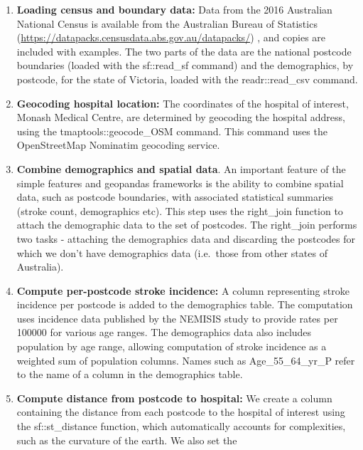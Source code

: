 \documentclass[utf8]{frontiersHLTH}
\begin{document}
\begin{table}[h]
\begin{center}
\begin{mdframed}[backgroundcolor=blue!20]
  \sffamily
  \tiny
\begin{enumerate}
\def\labelenumi{\arabic{enumi}.}
\item
  {\bf Loading census and boundary data:} Data from the 2016 Australian
  National Census is available from the Australian Bureau of Statistics
  (\url{https://datapacks.censusdata.abs.gov.au/datapacks/}) , and
  copies are included with examples. The two parts of the data are the
  national postcode boundaries (loaded with the sf::read\_sf command)
  and the demographics, by postcode, for the state of Victoria, loaded
  with the readr::read\_csv command.
\item
  {\bf Geocoding hospital location:} The coordinates of the hospital of
  interest, Monash Medical Centre, are determined by geocoding the
  hospital address, using the tmaptools::geocode\_OSM command. This
  command uses the OpenStreetMap Nominatim geocoding service.
\item
  {\bf Combine demographics and spatial data}. An important feature of the
  simple features and geopandas frameworks is the ability to combine
  spatial data, such as postcode boundaries, with associated statistical
  summaries (stroke count, demographics etc). This step uses the
  right\_join function to attach the demographic data to the set of
  postcodes. The right\_join performs two tasks - attaching the
  demographics data and discarding the postcodes for which we don't have
  demographics data (i.e.~those from other states of Australia).
\item
  {\bf Compute per-postcode stroke incidence:} A column representing stroke
  incidence per postcode is added to the demographics table. The
  computation uses incidence data published by the NEMISIS\cite{thrift_stroke_2000}
  study to provide rates per 100000 for various age ranges. The
  demographics data also includes population by age range, allowing
  computation of stroke incidence as a weighted sum of population
  columns. Names such as Age\_55\_64\_yr\_P refer to the name of a
  column in the demographics table.
\item
  {\bf Compute distance from postcode to hospital:} We create a column
  containing the distance from each postcode to the hospital of interest
  using the sf::st\_distance function, which automatically accounts for
  complexities, such as the curvature of the earth. We also set the

\end{enumerate}
\end{mdframed}
\end{center}
\end{table}
\end{document}

